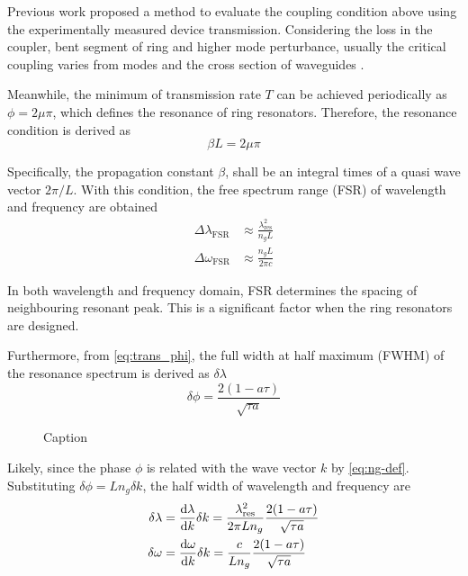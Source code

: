 \documentclass[final]{kuee_en}
\begin{document}
Previous work \cite{Yusuke2017} proposed a method to evaluate the coupling condition above using the experimentally measured device transmission. Considering the loss in the coupler, bent segment of ring and higher mode perturbance, usually the critical coupling varies from modes and the cross section of waveguides \cite{Pfeiffer2017}.

Meanwhile, the minimum of transmission rate $T$ can be achieved periodically as $\phi=2 \mu \pi$, which defines the resonance of ring resonators. Therefore, the resonance condition is derived as
\begin{equation}
    \beta L =2 \mu \pi
\end{equation}
    
Specifically, the propagation constant $\beta$, shall be an integral times of a quasi wave vector $2\pi/L$. With this condition, the free spectrum range (FSR) of wavelength and frequency are obtained
\begin{align}
    \Delta \lambda_\mathrm{FSR} &\approx \frac{\lambda_\mathrm{res}^2}{n_g L} \label{eq:fsr-wl} \\
    \Delta \omega_\mathrm{FSR} &\approx \frac{n_g L}{2\pi c} \label{eq:fsr-w}
\end{align}

In both wavelength and frequency domain, FSR determines the spacing of neighbouring resonant peak. This is a significant factor when the ring resonators are designed.

Furthermore, from \autoref{eq:trans_phi}, the full width at half maximum (FWHM) of the resonance spectrum is derived as $\delta\lambda$
\begin{equation}\label{eq:fwhm_phi}
    \delta\phi = \frac{2(1- a \tau)}{\sqrt{\tau a}}
\end{equation}
\begin{figure}
    \centering
    
    \caption{Caption}
    \label{fig:my_label}
\end{figure}
Likely, since the phase $\phi$ is related with the wave vector $k$ by \autoref{eq:ng-def}. Substituting $\delta \phi = L n_g \delta k$, the half width of wavelength and frequency are
\begin{align}
    \delta \lambda &= \dv{\lambda}{k}\delta k = \frac{\lambda_\mathrm{res}^2}{2\pi L n_g} \frac{2(1- a \tau)}{\sqrt{\tau a}} \label{eq:fwhm_wl}\\
    \delta \omega &= \dv{\omega}{k}\delta k = \frac{c}{ L n_g} \frac{2(1- a \tau)}{\sqrt{\tau a}} \label{eq:fwhm_w}
\end{align}
\end{document}

